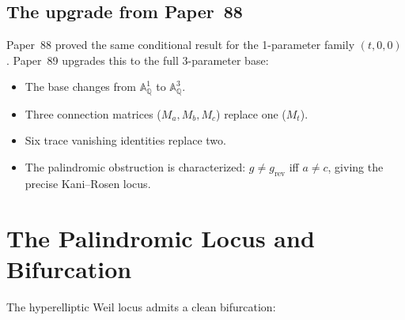 \documentclass[11pt,a4paper]{article}
\theoremstyle{definition}
\theoremstyle{remark}
\newcommand{\QQ}{\mathbb{Q}}
\newcommand{\Aff}{\mathbb{A}}
\begin{document}
\subsection{The upgrade from Paper~88}

Paper~88 proved the same conditional result for the 1-parameter family
$(t,0,0)$.
Paper~89 upgrades this to the full 3-parameter base:
\begin{itemize}[nosep]
  \item The base changes from $\Aff^1_\QQ$ to $\Aff^3_\QQ$.
  \item Three connection matrices ($M_a, M_b, M_c$) replace one ($M_t$).
  \item Six trace vanishing identities replace two.
  \item The palindromic obstruction is characterized: $g \neq g_{\mathrm{rev}}$
        iff $a \neq c$, giving the precise Kani--Rosen locus.
\end{itemize}


\section{The Palindromic Locus and Bifurcation}

The hyperelliptic Weil locus admits a clean bifurcation:
\end{document}
